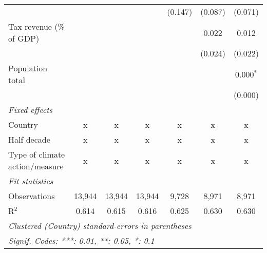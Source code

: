 \begin{tabular}{lcccccc}
                                                    &         &                &                & (0.147)        & (0.087)        & (0.071)\\   
   Tax revenue (\% of GDP)                          &         &                &                &                & 0.022          & 0.012\\   
                                                    &         &                &                &                & (0.024)        & (0.022)\\   
   Population total                                 &         &                &                &                &                & 0.000$^{*}$\\   
                                                    &         &                &                &                &                & (0.000)\\   
   \emph{Fixed effects}\\
   Country                                          & x       & x              & x              & x              & x              & x\\  
   Half decade                                      & x       & x              & x              & x              & x              & x\\  
   Type of climate action/measure                   & x       & x              & x              & x              & x              & x\\  
   \midrule \emph{Fit statistics}\\
   Observations                                     & 13,944  & 13,944         & 13,944         & 9,728          & 8,971          & 8,971\\  
   R$^2$                                            & 0.614   & 0.615          & 0.616          & 0.625          & 0.630          & 0.630\\  
   \midrule
   \multicolumn{7}{l}{\emph{Clustered (Country) standard-errors in parentheses}}\\
   \multicolumn{7}{l}{\emph{Signif. Codes: ***: 0.01, **: 0.05, *: 0.1}}\\
\end{tabular}
\par\endgroup


